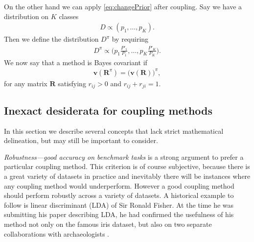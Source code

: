 \documentclass[pdflatex, sn-basic]{sn-jnl}%
\theoremstyle{thmstyleone}%
\theoremstyle{thmstyletwo}%
\theoremstyle{thmstylethree}%
\begin{document}
On the other hand we can apply \eqref{eq:changePrior} after coupling. Say we have a distribution on $K$ classes
\begin{align}
D \propto (p_1, \ldots, p_K).
\end{align}
Then we define the distribution $D^\pi$ by requiring 
\begin{align}
D^\pi \propto \biggl(p_1 \frac{P'_1}{P_1}, \ldots, p_K \frac{P'_K}{P_K}\biggr). \label{def:prior:effect}
\end{align}
We now say that a method is Bayes covariant if
\begin{align}
\boldsymbol{v}(\boldsymbol{R}^\pi)=	\bigl(\boldsymbol{v}(\boldsymbol{R})\bigr)^\pi,
\end{align}
for any matrix $\boldsymbol{R}$ satisfying $r_{ij}> 0$ and $r_{ij}+r_{ji} = 1$.




%


\subsection{Inexact desiderata for coupling methods}

\label{sec:des:inexact}

In this section we describe several concepts that lack strict mathematical delineation, but may still be important to consider.

\emph{Robustness---good accuracy on benchmark tasks} is  a strong argument to prefer a particular coupling method. This criterion is of course subjective, because there is a great variety of datasets in practice and inevitably there will be instances where any coupling method would underperform. However a good coupling method should perform robustly across a variety of datasets. A historical  example to follow is linear discriminant (LDA) of  Sir Ronald Fisher. At the time he was submitting his paper describing LDA, 
he had confirmed the usefulness of his method not only on the famous iris dataset, but also on two separate collaborations with archaeologists \cite{barnard1935secular, martin1936study}. 
\end{document}
